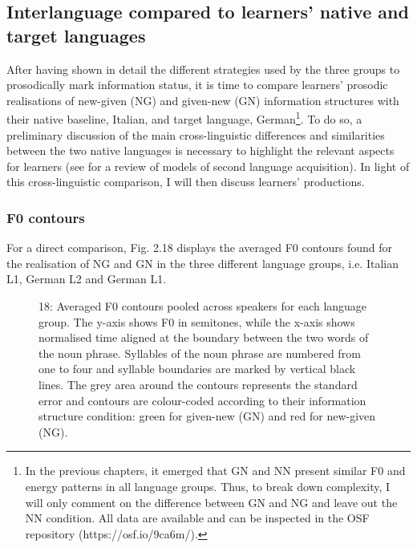 \subsection{Interlanguage compared to learners’ native and target languages}
\hypertarget{Toc191305911}{}
After having shown in detail the different strategies used by the three groups to prosodically mark information status, it is time to compare learners’ prosodic realisations of new-given (NG) and given-new (GN) information structures with their native baseline, Italian, and target language, German\footnote{In the previous chapters, it emerged that GN and NN present similar F0 and energy patterns in all language groups. Thus, to break down complexity, I will only comment on the difference between GN and NG and leave out the NN condition. All data are available and can be inspected in the OSF repository (https://osf.io/9ca6m/).}. To do so, a preliminary discussion of the main cross-linguistic differences and similarities between the two native languages is necessary to highlight the relevant aspects for learners (see \citealt{RasierHiligsmann2007} for a review of models of second language acquisition). In light of this cross-linguistic comparison, I will then discuss learners’ productions. 

\subsubsection{F0 contours}
\hypertarget{Toc191305912}{}
For a direct comparison, Fig. 2.18 displays the averaged F0 contours found for the realisation of NG and GN in the three different language groups, i.e. Italian L1, German L2 and German L1.

  
 

\begin{stylecaption}\begin{figure}
\caption{18: Averaged F0 contours pooled across speakers for each language group. The y-axis shows F0 in semitones, while the x-axis shows normalised time aligned at the boundary between the two words of the noun phrase. Syllables of the noun phrase are numbered from one to four and syllable boundaries are marked by vertical black lines. The grey area around the contours represents the standard error and contours are colour-coded according to their information structure condition: green for given-new (GN) and red for new-given (NG).}
\label{fig:key:2}
\end{figure}\end{stylecaption}

